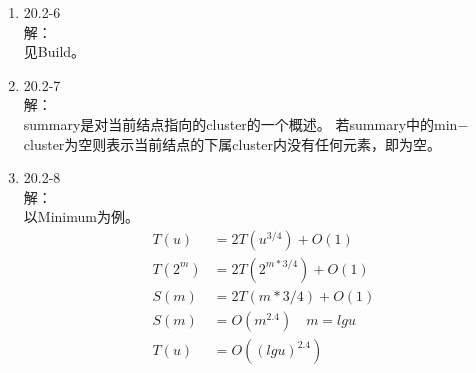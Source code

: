 \documentclass[UTF8]{ctexart}
\begin{document}
\begin{enumerate}
	\item 20.2-6 \\
	解：\\
	见Build。
	
	\item 20.2-7 \\
	解：\\
	summary是对当前结点指向的cluster的一个概述。
	若summary中的min$-$cluster为空则表示当前结点的下属cluster内没有任何元素，即为空。
	
	\item 20.2-8 \\
	解：\\
	以Minimum为例。
	\begin{align*}
		T(u) &= 2T(u^{3/4}) + O(1)	\\
		T(2^m) &= 2T(2 ^ {m \ast 3/4}) + O(1)  \\
        S(m) &= 2T(m \ast 3/4) + O(1) \\
        S(m) &= O(m^{2.4}) \quad m = lgu  \\
        T(u) &= O({(lgu)}^{2.4})
	\end{align*}
	
\end{enumerate}
\end{document}
